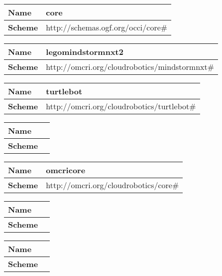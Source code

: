 \begin{center} 
\begin{tabular}{|l|l|}
  \hline
  \textbf{Name} & core \\
  \hline  
  \textbf{Scheme} & http://schemas.ogf.org/occi/core\# \\
  \hline
\end{tabular}
\end{center}
\begin{center} 
\begin{tabular}{|l|l|}
  \hline
  \textbf{Name} & legomindstormnxt2 \\
  \hline  
  \textbf{Scheme} & http://omcri.org/cloudrobotics/mindstormnxt\# \\
  \hline
\end{tabular}
\end{center}
\begin{center} 
\begin{tabular}{|l|l|}
  \hline
  \textbf{Name} & turtlebot \\
  \hline  
  \textbf{Scheme} & http://omcri.org/cloudrobotics/turtlebot\# \\
  \hline
\end{tabular}
\end{center}
\begin{center} 
\begin{tabular}{|l|l|}
  \hline
  \textbf{Name} &  \\
  \hline  
  \textbf{Scheme} &  \\
  \hline
\end{tabular}
\end{center}
\begin{center} 
\begin{tabular}{|l|l|}
  \hline
  \textbf{Name} & omcricore \\
  \hline  
  \textbf{Scheme} & http://omcri.org/cloudrobotics/core\# \\
  \hline
\end{tabular}
\end{center}
\begin{center} 
\begin{tabular}{|l|l|}
  \hline
  \textbf{Name} &  \\
  \hline  
  \textbf{Scheme} &  \\
  \hline
\end{tabular}
\end{center}
\begin{center} 
\begin{tabular}{|l|l|}
  \hline
  \textbf{Name} &  \\
  \hline  
  \textbf{Scheme} &  \\
  \hline
\end{tabular}
\end{center}


